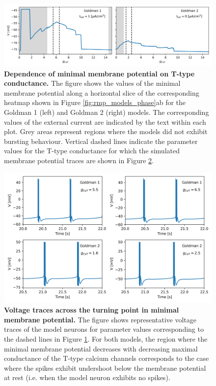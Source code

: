 \documentclass[../main.tex]{subfiles}
\begin{document}
\begin{figure}[!t]
    \centering
    \includegraphics[width=0.9\linewidth]{../img/rmp/goldman_1_2_i_slices.png}
    \caption[Dependence of minimal membrane potential on T-type conductance]{\textbf{Dependence of minimal membrane potential on T-type conductance.} The figure shows the values of the minimal membrane potential along a horizontal slice of the corresponding heatmap shown in Figure \ref{fig:rmp_models_phase}ab for the Goldman 1 (left) and Goldman 2 (right) models. The corresponding values of the external current are indicated by the text within each plot. Grey areas represent regions where the models did not exhibit bursting behaviour. Vertical dashed lines indicate the parameter values for the T-type conductance for which the simulated membrane potential traces are shown in Figure \ref{fig:rmp_models_phase_i_slices_voltage}.}
    \label{fig:rmp_models_phase_i_slices}
\end{figure}

\begin{figure}[!t]
    \centering
    \includegraphics[width=0.9\linewidth]{../img/rmp/goldman_1_2_i_slices_vtraces.png}
    \caption[Voltage traces across the turning point in minimal membrane potential]{\textbf{Voltage traces across the turning point in minimal membrane potential.} The figure shows representative voltage traces of the model neurons for parameter values corresponding to the dashed lines in Figure \ref{fig:rmp_models_phase_i_slices}. For both models, the region where the minimal membrane potential decreases with decreasing maximal conductance of the T-type calcium channels corresponds to the case where the spikes exhibit undershoot below the membrane potential at rest (i.e. when the model neuron exhibits no spikes).}
    \label{fig:rmp_models_phase_i_slices_voltage}
\end{figure}
\end{document}
